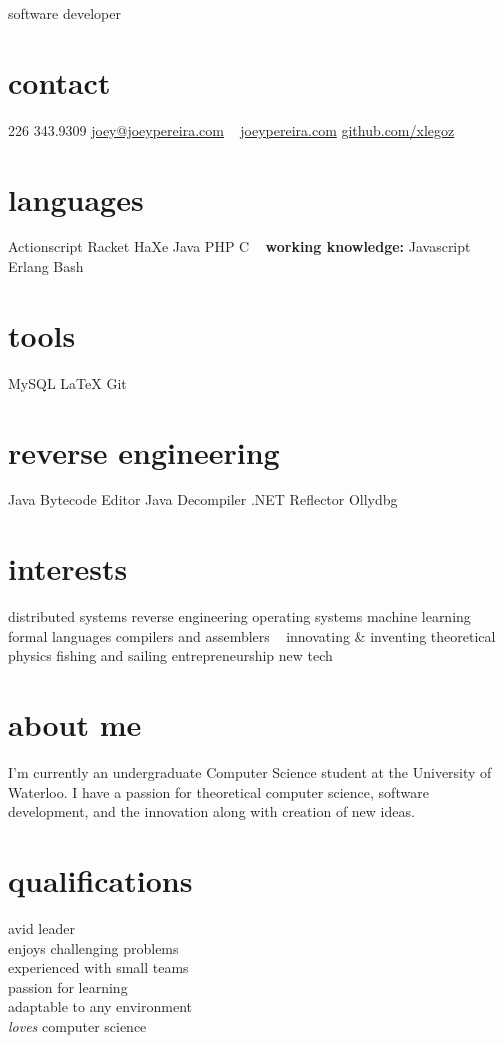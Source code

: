 \documentclass[]{friggeri-cv}
\begin{document}
       {software developer}

\begin{aside}
  \section{contact}
    226 343.9309
    \href{mailto:joey@joeypereira.com}{joey@joeypereira.com}
    ~
    \href{http://joeypereira.com}{joeypereira.com}
    \href{http://www.github.com/xlegoz}{github.com/xlegoz}
  \section{languages}
	Actionscript
	Racket
	HaXe
	Java
	PHP
	C
	~
	\textbf{working knowledge:}
	Javascript
	Erlang
	Bash	
  \section{tools}
    MySQL
    \LaTeX
	Git
  \section{reverse engineering}
  	Java Bytecode Editor
  	Java Decompiler
  	.NET Reflector
  	Ollydbg
  \section{interests}
  	distributed systems
  	reverse engineering
  	operating systems
  	machine learning
  	formal languages
  	compilers and assemblers
  	~
	innovating \& inventing
  	theoretical physics
  	fishing and sailing
  	entrepreneurship
  	new tech
\end{aside}


\section{about me}
I'm currently an undergraduate Computer Science student at the University of Waterloo. I have a passion for theoretical computer science, software development, and the innovation along with creation of new ideas.
\section{qualifications}
\begin{multicols}{3}
 avid leader \\ enjoys challenging problems \\ experienced with small teams \\ passion for learning \\ adaptable to any environment \\ {\em loves} computer science
\end{multicols}
\end{document}
